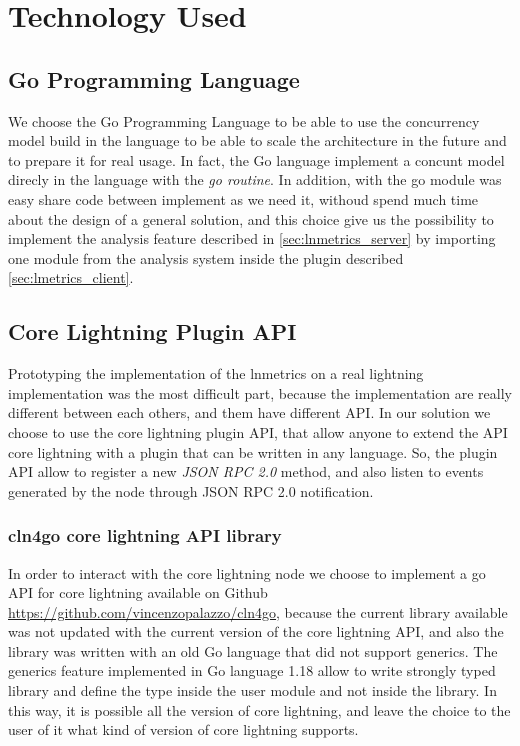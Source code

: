 \chapter{Technology Used}

\section{Go Programming Language}

We choose the Go Programming Language to be able to use the concurrency model
build in the language to be able to scale the architecture in the future and to prepare
it for real usage. In fact, the Go language implement a concunt model direcly in 
the language with the \emph{go routine}.
In addition, with the go module was easy share code between implement as we need it, 
withoud spend much time about the design of a general solution, and this choice
give us the possibility to implement the analysis feature described in \ref{sec:lnmetrics_server}
by importing one module from the analysis system inside the plugin described \ref{sec:lmetrics_client}.

\section{Core Lightning Plugin API}

Prototyping the implementation of the lnmetrics on a real lightning implementation was the 
most difficult part, because the implementation are really different between each others, and 
them have different API. In our solution we choose to use the core lightning plugin API, that 
allow anyone to extend the API core lightning with a plugin that can be written in any language. 
So, the plugin API allow to register a new \emph{JSON RPC 2.0}\cite{jsonrpc20} method, and 
also listen to events generated by the node through JSON RPC 2.0 notification.

\subsection{cln4go core lightning API library}

In order to interact with the core lightning node we choose to implement a go 
API for core lightning available on Github \url{https://github.com/vincenzopalazzo/cln4go}, 
because the current library available was not updated with the current version of 
the core lightning API, and also the library was written with an old Go language 
that did not support generics. The generics feature implemented in Go language 
1.18 allow to write strongly typed library and define the type inside the 
user module and not inside the library. In this way, it is possible all the version 
of core lightning, and leave the choice to the user of it what kind of version of core lightning 
supports. 

